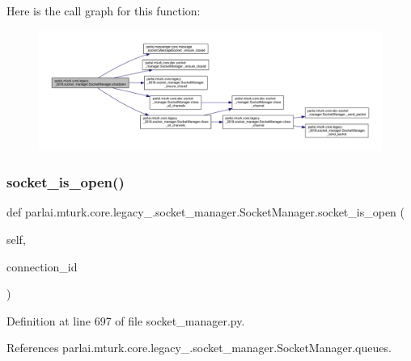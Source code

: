 Here is the call graph for this function\+:
\nopagebreak
\begin{figure}[H]
\begin{center}
\leavevmode
\includegraphics[width=350pt]{classparlai_1_1mturk_1_1core_1_1legacy__2018_1_1socket__manager_1_1SocketManager_a994294d92872fd98ec0fabd9d2a56793_cgraph}
\end{center}
\end{figure}
\mbox{\label{classparlai_1_1mturk_1_1core_1_1legacy__2018_1_1socket__manager_1_1SocketManager_a8fa0c55682c0eb89ba4f4d7dcfd9fdba}} 
\subsubsection{\texorpdfstring{socket\+\_\+is\+\_\+open()}{socket\_is\_open()}}
{\footnotesize\ttfamily def parlai.\+mturk.\+core.\+legacy\+\_.\+socket\+\_\+manager.\+Socket\+Manager.\+socket\+\_\+is\+\_\+open (\begin{DoxyParamCaption}\item[{}]{self,  }\item[{}]{connection\+\_\+id }\end{DoxyParamCaption})}



Definition at line 697 of file socket\+\_\+manager.\+py.



References parlai.\+mturk.\+core.\+legacy\+\_.\+socket\+\_\+manager.\+Socket\+Manager.\+queues.



